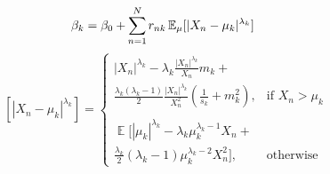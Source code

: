 \documentclass[conference]{IEEEtran}
\begin{document}
    \begin{equation}\label{betak}
        \beta_k = \beta_0 + \sum_{\mathclap{n=1}}^{N} r_{nk} \mathop{\mathbb{E}_\mu}[|X_n - \mu_k|^{\lambda_k}]
    \end{equation}
     \[
        \mathop{\mathbb{E}_\mu}[|X_n - \mu_k|^{\lambda_k}]=
    \begin{cases}
         |X_n|^{\lambda_k} - \lambda_k \frac{|X_n|^{\lambda_k}}{X_n} m_k + \\
            \frac{\lambda_k(\lambda_k - 1)}{2} \frac{|X_n|^{\lambda_k}}{X_n^2}(\frac{1}{s_k} + m_k^2)     ,& \text{if } X_n > \mu_k\\ \\
            \mathop{\mathbb{E}}[|\mu_k|^{\lambda_k} - \lambda_k \mu_k^{\lambda_k - 1} X_n + \\ 
            \frac{\lambda_k}{2} (\lambda_k - 1) \mu_k^{\lambda_k - 2} X_n^2],              & \text{otherwise}
        \end{cases}
    \]
    
\end{document}
